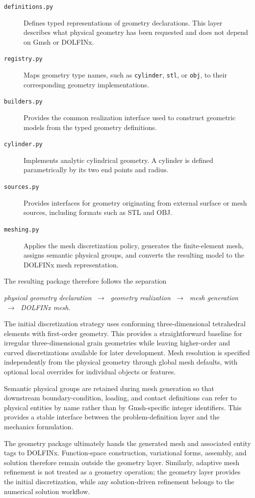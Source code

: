 \begin{description}
    \item[\texttt{definitions.py}] Defines typed representations of geometry declarations. This layer describes what physical geometry has been requested and does not depend on Gmsh or DOLFINx.

    \item[\texttt{registry.py}] Maps geometry type names, such as \texttt{cylinder}, \texttt{stl}, or \texttt{obj}, to their corresponding geometry implementations.

    \item[\texttt{builders.py}] Provides the common realization interface used to construct geometric models from the typed geometry definitions.

    \item[\texttt{cylinder.py}] Implements analytic cylindrical geometry. A cylinder is defined parametrically by its two end points and radius.

    \item[\texttt{sources.py}] Provides interfaces for geometry originating from external surface or mesh sources, including formats such as STL and OBJ.

    \item[\texttt{meshing.py}] Applies the mesh discretization policy, generates the finite-element mesh, assigns semantic physical groups, and converts the resulting model to the DOLFINx mesh representation.
\end{description}

The resulting package therefore follows the separation

\begin{center}
\textit{physical geometry declaration}
$\;\longrightarrow\;$
\textit{geometry realization}
$\;\longrightarrow\;$
\textit{mesh generation}
$\;\longrightarrow\;$
\textit{DOLFINx mesh}.
\end{center}

The initial discretization strategy uses conforming three-dimensional tetrahedral elements with first-order geometry. This provides a straightforward baseline for irregular three-dimensional grain geometries while leaving higher-order and curved discretizations available for later development. Mesh resolution is specified independently from the physical geometry through global mesh defaults, with optional local overrides for individual objects or features.

Semantic physical groups are retained during mesh generation so that downstream boundary-condition, loading, and contact definitions can refer to physical entities by name rather than by Gmsh-specific integer identifiers. This provides a stable interface between the problem-definition layer and the mechanics formulation.

The geometry package ultimately hands the generated mesh and associated entity tags to DOLFINx. Function-space construction, variational forms, assembly, and solution therefore remain outside the geometry layer. Similarly, adaptive mesh refinement is not treated as a geometry operation; the geometry layer provides the initial discretization, while any solution-driven refinement belongs to the numerical solution workflow.

